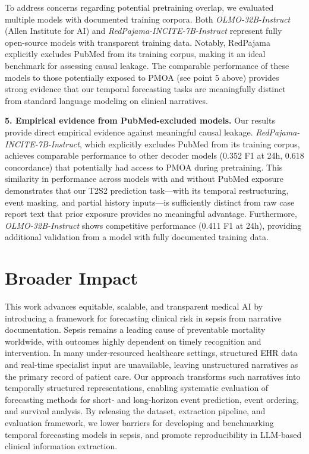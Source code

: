 To address concerns regarding potential pretraining overlap, we evaluated multiple models with documented training corpora. Both \textit{OLMO-32B-Instruct} (Allen Institute for AI) and \textit{RedPajama-INCITE-7B-Instruct} represent fully open-source models with transparent training data. Notably, RedPajama explicitly excludes PubMed from its training corpus, making it an ideal benchmark for assessing causal leakage. The comparable performance of these models to those potentially exposed to PMOA (see point 5 above) provides strong evidence that our temporal forecasting tasks are meaningfully distinct from standard language modeling on clinical narratives.

\textbf{5. Empirical evidence from PubMed-excluded models.}
Our results provide direct empirical evidence against meaningful causal leakage. \textit{RedPajama-INCITE-7B-Instruct}, which explicitly excludes PubMed from its training corpus, achieves comparable performance to other decoder models (0.352 F1 at 24h, 0.618 concordance) that potentially had access to PMOA during pretraining. This similarity in performance across models with and without PubMed exposure demonstrates that our T2S2 prediction task—with its temporal restructuring, event masking, and partial history inputs—is sufficiently distinct from raw case report text that prior exposure provides no meaningful advantage. Furthermore, \textit{OLMO-32B-Instruct} shows competitive performance (0.411 F1 at 24h), providing additional validation from a model with fully documented training data.


\section{Broader Impact}
\label{apd:broader_impact}
This work advances equitable, scalable, and transparent medical AI by introducing a framework for forecasting clinical risk in sepsis from narrative documentation. Sepsis remains a leading cause of preventable mortality worldwide, with outcomes highly dependent on timely recognition and intervention. In many under‑resourced healthcare settings, structured EHR data and real‑time specialist input are unavailable, leaving unstructured narratives as the primary record of patient care. Our approach transforms such narratives into temporally structured representations, enabling systematic evaluation of forecasting methods for short‑ and long‑horizon event prediction, event ordering, and survival analysis. By releasing the dataset, extraction pipeline, and evaluation framework, we lower barriers for developing and benchmarking temporal forecasting models in sepsis, and promote reproducibility in LLM‑based clinical information extraction.

